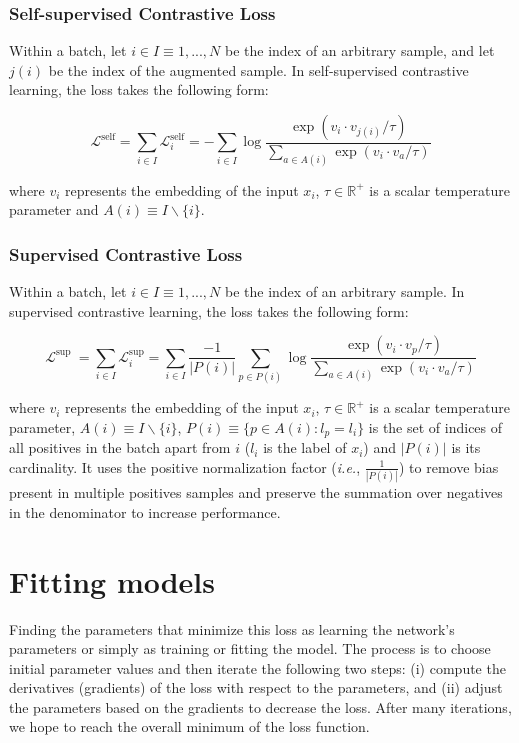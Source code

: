 \subsubsection{Self-supervised Contrastive Loss}
Within a batch, let $i \in I \equiv {1,...,N}$ be the index of an arbitrary sample, and let $j(i)$ be the index of the augmented sample. In self-supervised contrastive learning, the loss takes the following form:

\begin{equation}
    \mathcal{L}^{\text {self}}=\sum_{i \in I} \mathcal{L}_{i}^{\text {self}} = -\sum_{i\in I} \log \frac{\exp \left(v_{i} \cdot v_{j(i)} / \tau\right)}{\sum_{a\in A(i)} \exp \left(v_{i} \cdot v_{a} / \tau\right)}
\end{equation}

\noindent where $v_{i}$ represents the embedding of the input $x_{i}$, $\tau\in\mathbb{R}^{+}$ is a scalar temperature parameter and $A(i)\equiv I\backslash\{i\}$.

\subsubsection{Supervised Contrastive Loss}
Within a batch, let $i \in I \equiv {1,...,N}$ be the index of an arbitrary sample. In supervised contrastive learning, the loss takes the following form:

\begin{equation}
    \mathcal{L}^{\text {sup }}=\sum_{i \in I} \mathcal{L}_{i}^{\text {sup}} =\sum_{i \in I} \frac{-1}{|P(i)|} \sum_{p\in P(i)} \log \frac{\exp \left(v_{i} \cdot v_{p} / \tau\right)}{\sum_{a\in A(i)} \exp \left(v_{i} \cdot v_{a} / \tau\right)}
\end{equation}

\noindent where $v_{i}$ represents the embedding of the input $x_{i}$, $\tau\in\mathbb{R}^{+}$ is a scalar temperature parameter, $A(i)\equiv I\backslash\{i\}$, $P(i)\equiv \{p\in A(i) : l_{p} = l_{i}\}$ is the set of indices of all positives in the batch apart from $i$ ($l_{i}$ is the label of $x_{i}$) and $|P(i)|$ is its cardinality. It uses the positive normalization factor (\textit{i.e.}, $\frac{1}{|P(i)|}$) to remove bias present in multiple positives samples and preserve the summation over negatives in the denominator to increase performance.

\section{Fitting models}
Finding the parameters that minimize this loss as learning the network’s parameters or simply as training or fitting the model. The process is to choose initial parameter values and then iterate the following two steps: (i) compute the derivatives (gradients) of the loss with respect to the parameters, and (ii) adjust the parameters based on the gradients to decrease the loss. After many iterations, we hope to reach the overall minimum of the loss function.

